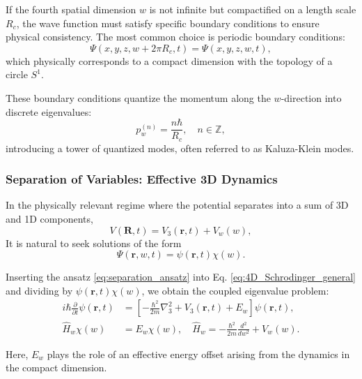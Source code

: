 \documentclass[12pt]{article}
\begin{document}
If the fourth spatial dimension \(w\) is not infinite but compactified on a length scale \(R_c\), the wave function must satisfy specific boundary conditions to ensure physical consistency. The most common choice is periodic boundary conditions:
\begin{equation}
    \Psi(x, y, z, w + 2\pi R_c, t) = \Psi(x, y, z, w, t),
    \label{eq:periodic_bc}
\end{equation}
which physically corresponds to a compact dimension with the topology of a circle \(S^1\).

These boundary conditions quantize the momentum along the \(w\)-direction into discrete eigenvalues:
\begin{equation}
    p_w^{(n)} = \frac{n \hbar}{R_c}, \quad n \in \mathbb{Z},
\end{equation}
introducing a tower of quantized modes, often referred to as Kaluza-Klein modes.

\subsubsection*{Separation of Variables: Effective 3D Dynamics}

In the physically relevant regime where the potential separates into a sum of 3D and 1D components,
\begin{equation}
    V(\mathbf{R}, t) = V_3(\mathbf{r}, t) + V_w(w),
\end{equation}
It is natural to seek solutions of the form
\begin{equation}
    \Psi(\mathbf{r}, w, t) = \psi(\mathbf{r}, t) \chi(w).
    \label{eq:separation_ansatz}
\end{equation}

Inserting the ansatz \eqref{eq:separation_ansatz} into Eq. \eqref{eq:4D_Schrodinger_general} and dividing by \(\psi(\mathbf{r}, t)\chi(w)\), we obtain the coupled eigenvalue problem:
\begin{align}
    i \hbar \frac{\partial}{\partial t} \psi(\mathbf{r}, t) &= \left[ -\frac{\hbar^2}{2m} \nabla_3^2 + V_3(\mathbf{r}, t) + E_w \right] \psi(\mathbf{r}, t), \label{eq:3D_effective_Schrodinger} \\
    \hat{H}_w \chi(w) &= E_w \chi(w), \quad \hat{H}_w = -\frac{\hbar^2}{2m} \frac{d^2}{dw^2} + V_w(w).
    \label{eq:w_dimension_eigenvalue}
\end{align}

Here, \(E_w\) plays the role of an effective energy offset arising from the dynamics in the compact dimension.
\end{document}
